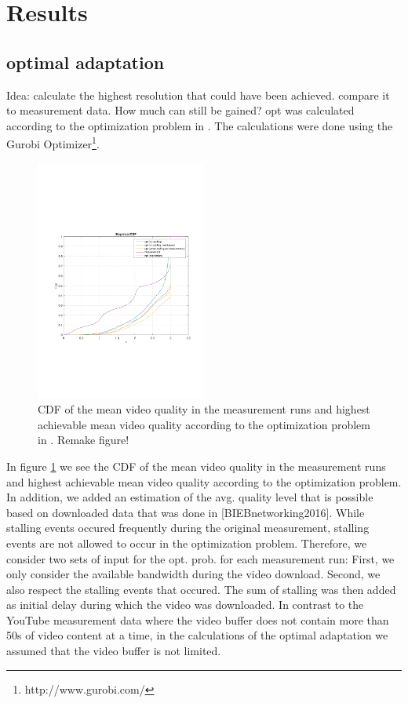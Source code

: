 
\section{Results}
\label{sec:results}


\subsection{optimal adaptation}

Idea: calculate the highest resolution that could have been achieved. compare it to measurement data. How much can still be gained?
opt was calculated according to the optimization problem in \cite{hossfeld2015identifying}. The calculations were done using the Gurobi Optimizer\footnote{http://www.gurobi.com/}.

\begin{figure}[t]
\centering
\includegraphics[width=0.5\textwidth]{figs/quality}%
\caption{CDF of the mean video quality in the measurement runs and highest achievable mean video quality according to the optimization problem in \cite{hossfeld2015identifying}. Remake figure!}
\label{fig:opt}%
\end{figure}

In figure \ref{fig:opt} we see the CDF of the mean video quality in the measurement runs and highest achievable mean video quality according to the optimization problem. In addition, we added an estimation of the avg. quality level that is possible based on downloaded data that was done in [BIEBnetworking2016]. While stalling events occured frequently during the original measurement, stalling events are not allowed to occur in the optimization problem. Therefore, we consider two sets of input for the opt. prob. for each measurement run: First, we only consider the available bandwidth during the video download. Second, we also respect the stalling events that occured. The sum of stalling was then added as initial delay during which the video was downloaded. In contrast to the YouTube measurement data where the video buffer does not contain more than 50s of video content at a time, in the calculations of the optimal adaptation we assumed that the video buffer is not limited.
